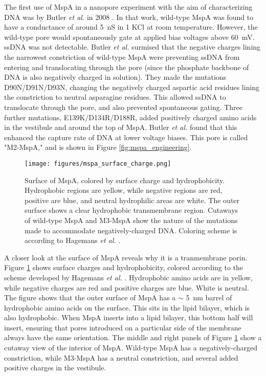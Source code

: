 The first use of MspA in a nanopore experiment with the aim of characterizing DNA was by Butler \textit{et al.} in 2008 \citep{Butler2008}.  In that work, wild-type MspA was found to have a conductance of around \SI{5}{\nano\siemens} in \SI{1}{\Molar} KCl at room temperature.  However, the wild-type pore would spontaneously gate at applied bias voltages above \SI{60}{\mV}.  ssDNA was not detectable.  Butler \textit{et al.} surmised that the negative charges lining the narrowest constriction of wild-type MspA were preventing ssDNA from entering and translocating through the pore (since the phosphate backbone of DNA is also negatively charged in solution).  They made the mutations D90N/D91N/D93N, changing the negatively charged aspartic acid residues lining the constriction to neutral asparagine residues.  This allowed ssDNA to translocate through the pore, and also prevented spontaneous gating.  Three further mutations, E139K/D134R/D188R, added positively charged amino acids in the vestibule and around the top of MspA.  Butler \textit{et al.} found that this enhanced the capture rate of DNA at lower voltage biases.  This pore is called "M2-MspA," and is shown in Figure \ref{fig:mspa_engineering}.

\begin{figure}[h]
\begin{centering}
\texttt{[image: figures/mspa\_surface\_charge.png]}
\caption[Hydrophobicity and surface charge of MspA]{Surface of MspA, colored by surface charge and hydrophobicity.  Hydrophobic regions are yellow, while negative regions are red, positive are blue, and neutral hydrophilic areas are white.  The outer surface shows a clear hydrophobic transmembrane region.  Cutaways of wild-type MspA and M3-MspA show the nature of the mutations made to accommodate negatively-charged DNA.  Coloring scheme is according to Hagemans \textit{et al.} \citep{Hagemans2015}.}
\label{fig:mspa_engineering_charge}
\end{centering}
\end{figure}

A closer look at the surface of MspA reveals why it is a tranmembrane porin.  Figure \ref{fig:mspa_engineering_charge} shows surface charges and hydrophobicity, colored according to the scheme developed by Hagemans \textit{et al.} \citep{Hagemans2015}.  Hydrophobic amino acids are in yellow, while negative charges are red and positive charges are blue.  White is neutral.  The figure shows that the outer surface of MspA has a $\sim$ \SI{5}{\nm} barrel of hydrophobic amino acids on the surface.  This sits in the lipid bilayer, which is also hydrophobic.  When MspA inserts into a lipid bilayer, this bottom half will insert, ensuring that pores introduced on a particular side of the membrane always have the same orientation.  The middle and right panels of Figure \ref{fig:mspa_engineering_charge} show a cutaway view of the interior of MspA.  Wild-type MspA has a negatively-charged constriction, while M3-MspA has a neutral constriction, and several added positive charges in the vestibule.

